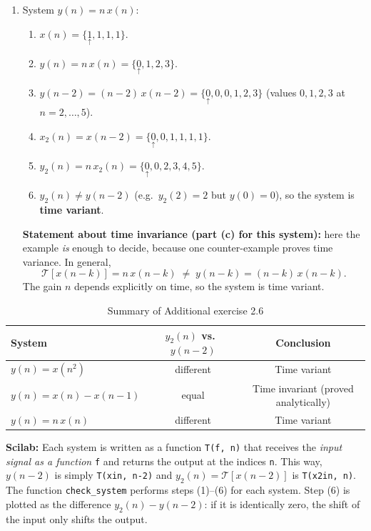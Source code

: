 \documentclass[12pt,a4paper]{article}
\newcommand{\org}[1]{\underset{\uparrow}{#1}}
\begin{document}
\begin{enumerate}[label=\textbf{(\alph*)}, leftmargin=*]
    \item System $y(n) = n\,x(n)$:
    \begin{enumerate}[label=(\arabic*)]
        \item $x(n) = \{\org{1}, 1, 1, 1\}$.
        \item $y(n) = n\,x(n) = \{\org{0}, 1, 2, 3\}$.
        \item $y(n-2) = (n-2)\,x(n-2) = \{\org{0}, 0, 0, 1, 2, 3\}$ (values $0,1,2,3$ at $n = 2,\dots,5$).
        \item $x_2(n) = x(n-2) = \{\org{0}, 0, 1, 1, 1, 1\}$.
        \item $y_2(n) = n\,x_2(n) = \{\org{0}, 0, 2, 3, 4, 5\}$.
        \item $y_2(n) \neq y(n-2)$ (e.g.\ $y_2(2) = 2$ but $y(0) = 0$), so the system is \textbf{time variant}.
    \end{enumerate}
    \textbf{Statement about time invariance (part (c) for this system):} here the example \emph{is} enough to decide, because one counter-example proves time variance. In general,
    \[ \mathcal{T}[x(n-k)] = n\,x(n-k) \;\neq\; y(n-k) = (n-k)\,x(n-k). \]
    The gain $n$ depends explicitly on time, so the system is time variant.
\end{enumerate}

\begin{table}[H]
    \centering
    \caption{Summary of Additional exercise 2.6}
    \begin{tabular}{|l|c|c|}
        \hline
        \rowcolor{headergray}\textbf{System} & $y_2(n)$ vs.\ $y(n-2)$ & \textbf{Conclusion} \\ \hline
        $y(n) = x(n^2)$        & different & Time variant \\ \hline
        $y(n) = x(n) - x(n-1)$ & equal     & Time invariant (proved analytically) \\ \hline
        $y(n) = n\,x(n)$       & different & Time variant \\ \hline
    \end{tabular}
\end{table}

\noindent\textbf{Scilab:} Each system is written as a function \texttt{T(f, n)} that receives the \emph{input signal as a function} \texttt{f} and returns the output at the indices \texttt{n}. This way, $y(n-2)$ is simply \texttt{T(xin, n-2)} and $y_2(n) = \mathcal{T}[x(n-2)]$ is \texttt{T(x2in, n)}. The function \texttt{check\_system} performs steps (1)--(6) for each system. Step (6) is plotted as the difference $y_2(n) - y(n-2)$: if it is identically zero, the shift of the input only shifts the output.
\end{document}
